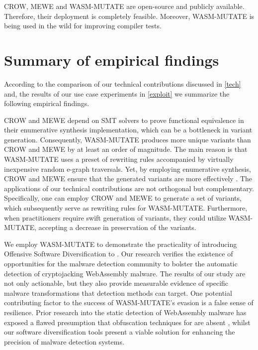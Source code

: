 CROW, MEWE and WASM-MUTATE are open-source and publicly available.
Therefore, their deployment is completely feasible.
Moreover, WASM-MUTATE is being used in the wild for improving \Wasm compiler tests.


\section{Summary of empirical findings}

According to the comparison of our technical contributions discussed in \autoref{tech} and, the results of our use case experiments in \autoref{exploit} we summarize the following empirical findings.

\begin{strategy}
    CROW and MEWE depend on SMT solvers to prove functional equivalence in their enumerative synthesis implementation, which can be a bottleneck in variant generation. 
    Consequently, WASM-MUTATE produces more unique variants than CROW and MEWE by at least an order of magnitude. 
    The main reason is that WASM-MUTATE uses a preset of rewriting rules accompanied by virtually inexpensive random e-graph traversals.
    Yet, by employing enumerative synthesis, CROW and MEWE ensure that the generated variants are more effectively .
    The applications of our technical contributions are not orthogonal but complementary. 
    Specifically, one can employ CROW and MEWE to generate a set of variants, which subsequently serve as rewriting rules for WASM-MUTATE. 
    Furthermore, when practitioners require swift generation of variants, they could utilize WASM-MUTATE, accepting a decrease in preservation of the variants.
\end{strategy}


\begin{strategy}
    We employ WASM-MUTATE to demonstrate the practicality of introducing Offensive Software Diversification to \Wasm. 
    Our research verifies the existence of opportunities for the malware detection community to bolster the automatic detection of cryptojacking WebAssembly malware. 
    The results of our study are not only actionable, but they also provide measurable evidence of specific malware transformations that detection methods can target. 
    One potential contributing factor to the success of WASM-MUTATE's evasion is a false sense of resilience. 
    Prior research into the static detection of WebAssembly malware has exposed a flawed presumption that obfuscation techniques for \Wasm are absent \cite{Minesweeper, MinerRay, SEISMIC, RAPID, MINOS}, whilst our software diversification tools present a viable solution for enhancing the precision of \Wasm malware detection systems.
\end{strategy}


